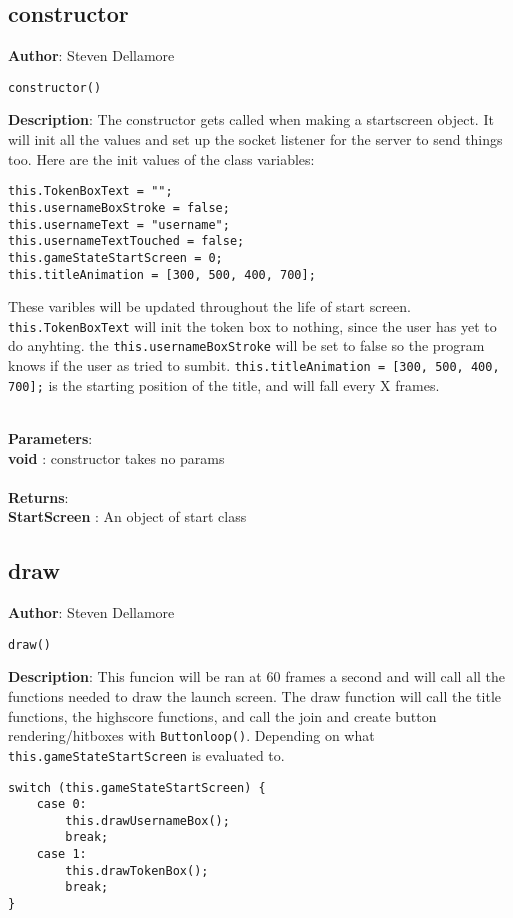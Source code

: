 \documentclass[12pt]{article}
\begin{document}
\subsection{constructor}
\textbf{Author}: Steven Dellamore 
\vspace*{1\baselineskip}
\begin{lstlisting}
constructor()
\end{lstlisting} 
\vspace*{1\baselineskip}
\textbf{Description}: The constructor gets called when making a startscreen object. It will init all the values and set up the socket listener for the server to send things too. Here are the init values of the class variables: 
\begin{verbatim}
this.TokenBoxText = ""; 
this.usernameBoxStroke = false; 
this.usernameText = "username"; 
this.usernameTextTouched = false; 
this.gameStateStartScreen = 0;
this.titleAnimation = [300, 500, 400, 700];
\end{verbatim}
 These varibles will be updated throughout the life of start screen. \texttt{this.TokenBoxText} will init the token box to nothing, since the user has yet to do anyhting. the \texttt{this.usernameBoxStroke} will be set to false so the program knows if the user as tried to sumbit. \texttt{this.titleAnimation = [300, 500, 400, 700];} is the starting position of the title, and will fall every X frames. 


\textbf{\large{\\Parameters}}:\\
\textbf{void }: constructor takes no params\\\textbf{\large{\\Returns}}:\\
\textbf{StartScreen }: An object of start class\\

\subsection{draw}
\textbf{Author}: Steven Dellamore 
\vspace*{1\baselineskip}
\begin{lstlisting}
draw()
\end{lstlisting} 
\vspace*{1\baselineskip}
\textbf{Description}: This funcion will be ran at 60 frames a second and will call all the functions needed to draw the launch screen. The draw function will call the title functions, the highscore functions, and call the join and create button rendering/hitboxes with \texttt{Buttonloop()}. Depending on what \texttt{this.gameStateStartScreen} is evaluated to. 
\begin{verbatim}
switch (this.gameStateStartScreen) {
	case 0:
		this.drawUsernameBox(); 
		break;
	case 1:
		this.drawTokenBox();
		break;
}
\end{verbatim}
 
\end{document}
